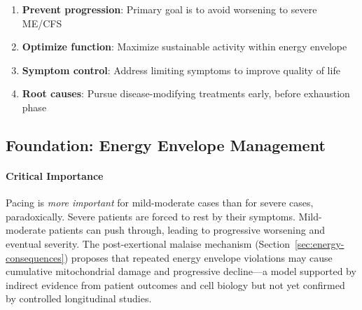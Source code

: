 \begin{enumerate}
    \item \textbf{Prevent progression}: Primary goal is to avoid worsening to severe ME/CFS
    \item \textbf{Optimize function}: Maximize sustainable activity within energy envelope
    \item \textbf{Symptom control}: Address limiting symptoms to improve quality of life
    \item \textbf{Root causes}: Pursue disease-modifying treatments early, before exhaustion phase
\end{enumerate}

\subsection{Foundation: Energy Envelope Management}
\label{sec:energy-envelope}

\paragraph{Critical Importance}

Pacing is \emph{more important} for mild-moderate cases than for severe cases, paradoxically. Severe patients are forced to rest by their symptoms. Mild-moderate patients can push through, leading to progressive worsening and eventual severity. The post-exertional malaise mechanism (Section~\ref{sec:energy-consequences}) proposes that repeated energy envelope violations may cause cumulative mitochondrial damage and progressive decline---a model supported by indirect evidence from patient outcomes and cell biology but not yet confirmed by controlled longitudinal studies.

